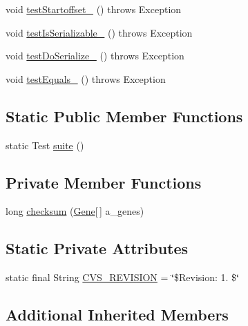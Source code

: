 \begin{DoxyCompactItemize}
\item 
void \hyperlink{classorg_1_1jgap_1_1impl_1_1_swapping_mutation_operator_test_ad21ac2ce7a69b2efd0b54e0eb38c0f6e}{test\-Startoffset\-\_} ()  throws Exception 
\item 
void \hyperlink{classorg_1_1jgap_1_1impl_1_1_swapping_mutation_operator_test_aef462662041ee1a81ebf4ba7993eb8f4}{test\-Is\-Serializable\-\_} ()  throws Exception 
\item 
void \hyperlink{classorg_1_1jgap_1_1impl_1_1_swapping_mutation_operator_test_a0c428c55e35ce090f55d9ec0cae50dca}{test\-Do\-Serialize\-\_} ()  throws Exception 
\item 
void \hyperlink{classorg_1_1jgap_1_1impl_1_1_swapping_mutation_operator_test_adb10c5fae3d4bce63859850e000fdf46}{test\-Equals\-\_} ()  throws Exception 
\end{DoxyCompactItemize}
\subsection*{Static Public Member Functions}
\begin{DoxyCompactItemize}
\item 
static Test \hyperlink{classorg_1_1jgap_1_1impl_1_1_swapping_mutation_operator_test_adc70fe2374c6f34f3999d82d54381163}{suite} ()
\end{DoxyCompactItemize}
\subsection*{Private Member Functions}
\begin{DoxyCompactItemize}
\item 
long \hyperlink{classorg_1_1jgap_1_1impl_1_1_swapping_mutation_operator_test_ac3f6deab8eec334f8bcc1a40ecf8f70e}{checksum} (\hyperlink{interfaceorg_1_1jgap_1_1_gene}{Gene}\mbox{[}$\,$\mbox{]} a\-\_\-genes)
\end{DoxyCompactItemize}
\subsection*{Static Private Attributes}
\begin{DoxyCompactItemize}
\item 
static final String \hyperlink{classorg_1_1jgap_1_1impl_1_1_swapping_mutation_operator_test_a9872aab6676e6549c1325276b748949a}{C\-V\-S\-\_\-\-R\-E\-V\-I\-S\-I\-O\-N} = \char`\"{}\$Revision\-: 1. \$\char`\"{}
\end{DoxyCompactItemize}
\subsection*{Additional Inherited Members}


